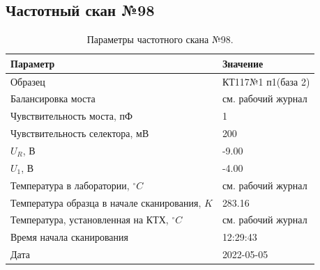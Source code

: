 \subsection{Частотный скан №98}
\begin{table}[!ht]
    \centering
    \caption{Параметры частотного скана №98.}
    \begin{tabular}{|l|l|}
        \hline
        Параметр                                       & Значение                  \\ \hline
        Образец                                        & КТ117№1 п1(база 2)        \\ \hline
        Балансировка моста                             & см. рабочий журнал        \\ \hline
        Чувствительность моста, пФ                     & 1                         \\ \hline
        Чувствительность селектора, мВ                 & 200                       \\ \hline
        $U_R$, В                                       & -9.00                     \\ \hline
        $U_1$, В                                       & -4.00                     \\ \hline
        Температура в лаборатории, $^\circ C$          & см. рабочий журнал        \\ \hline
        Температура образца в начале сканирования, $K$ & 283.16                    \\ \hline
        Температура, установленная на КТХ, $^\circ C$  & см. рабочий журнал        \\ \hline
        Время начала сканирования                      & 12:29:43                  \\ \hline
        Дата                                           & 2022-05-05                \\ \hline
    \end{tabular}
    \label{table:frequency_scan_98}
\end{table}

